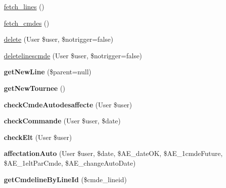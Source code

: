 \begin{DoxyCompactItemize}
\item 
\hyperlink{classTourneeUnique__lines_a0614c81d6e4ade3d2e1ee9d61cc87cf4}{fetch\+\_\+lines} ()
\item 
\hyperlink{classTourneeUnique__lines_a6891887c52ee8db06808f1e8d25b01f4}{fetch\+\_\+cmdes} ()
\item 
\hyperlink{classTourneeUnique__lines_ad0a9095e6cc9fbeb404fbc9ff283c464}{delete} (User \$user, \$notrigger=false)
\item 
\hyperlink{classTourneeUnique__lines_a97bf251efe7d4bb5f6fe020749e30d21}{deletelinescmde} (User \$user, \$notrigger=false)
\item 
\mbox{\label{classTourneeUnique__lines_a771ce3ae1f1380e133c0e87b79e828d5}} 
{\bfseries get\+New\+Line} (\$parent=null)
\item 
\mbox{\label{classTourneeUnique__lines_a3a1654b5f39c5cb7f887039fe5fb0a55}} 
{\bfseries get\+New\+Tournee} ()
\item 
\mbox{\label{classTourneeUnique__lines_a40b19ff63c4588a4f81298996333b414}} 
{\bfseries check\+Cmde\+Autodesaffecte} (User \$user)
\item 
\mbox{\label{classTourneeUnique__lines_a72600f0e0aed1a124789942a4e58f6a8}} 
{\bfseries check\+Commande} (User \$user, \$date)
\item 
\mbox{\label{classTourneeUnique__lines_a2b67b7a9a5d5586c38066702b92b134a}} 
{\bfseries check\+Elt} (User \$user)
\item 
\mbox{\label{classTourneeUnique__lines_a9b379183106e3994d0ad8406504d5cab}} 
{\bfseries affectation\+Auto} (User \$user, \$date, \$A\+E\+\_\+date\+OK, \$A\+E\+\_\+1cmde\+Future, \$A\+E\+\_\+1elt\+Par\+Cmde, \$A\+E\+\_\+change\+Auto\+Date)
\item 
\mbox{\label{classTourneeUnique__lines_acd83ac2710d5765cfcfb7ceba3b304a8}} 
{\bfseries get\+Cmdeline\+By\+Line\+Id} (\$cmde\+\_\+lineid)
\item 
\mbox{\label{classTourneeUnique__lines_a5dd9077be16c03edec32e221b7b1d44f}} 

\end{DoxyCompactItemize}

